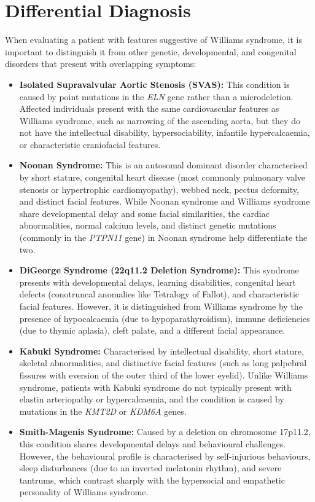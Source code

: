 \section*{Differential Diagnosis}
When evaluating a patient with features suggestive of Williams syndrome, it is important to distinguish it from other genetic, developmental, and congenital disorders that present with overlapping symptoms:
\begin{itemize}
    \item \textbf{Isolated Supravalvular Aortic Stenosis (SVAS):} This condition is caused by point mutations in the \textit{ELN} gene rather than a microdeletion. Affected individuals present with the same cardiovascular features as Williams syndrome, such as narrowing of the ascending aorta, but they do not have the intellectual disability, hypersociability, infantile hypercalcaemia, or characteristic craniofacial features.
    \item \textbf{Noonan Syndrome:} This is an autosomal dominant disorder characterised by short stature, congenital heart disease (most commonly pulmonary valve stenosis or hypertrophic cardiomyopathy), webbed neck, pectus deformity, and distinct facial features. While Noonan syndrome and Williams syndrome share developmental delay and some facial similarities, the cardiac abnormalities, normal calcium levels, and distinct genetic mutations (commonly in the \textit{PTPN11} gene) in Noonan syndrome help differentiate the two.
    \item \textbf{DiGeorge Syndrome (22q11.2 Deletion Syndrome):} This syndrome presents with developmental delays, learning disabilities, congenital heart defects (conotruncal anomalies like Tetralogy of Fallot), and characteristic facial features. However, it is distinguished from Williams syndrome by the presence of hypocalcaemia (due to hypoparathyroidism), immune deficiencies (due to thymic aplasia), cleft palate, and a different facial appearance.
    \item \textbf{Kabuki Syndrome:} Characterised by intellectual disability, short stature, skeletal abnormalities, and distinctive facial features (such as long palpebral fissures with eversion of the outer third of the lower eyelid). Unlike Williams syndrome, patients with Kabuki syndrome do not typically present with elastin arteriopathy or hypercalcaemia, and the condition is caused by mutations in the \textit{KMT2D} or \textit{KDM6A} genes.
    \item \textbf{Smith-Magenis Syndrome:} Caused by a deletion on chromosome 17p11.2, this condition shares developmental delays and behavioural challenges. However, the behavioural profile is characterised by self-injurious behaviours, sleep disturbances (due to an inverted melatonin rhythm), and severe tantrums, which contrast sharply with the hypersocial and empathetic personality of Williams syndrome.

\end{itemize}
